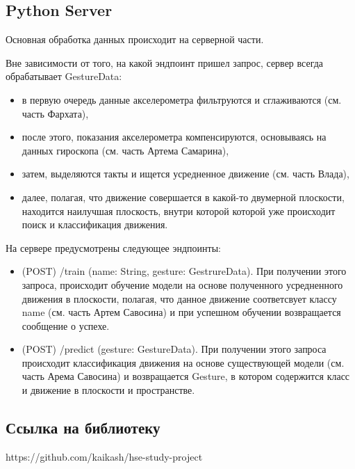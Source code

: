 \subsection{Python Server}
Основная обработка данных происходит на серверной части.

Вне зависимости от того, на какой эндпоинт пришел запрос, сервер всегда обрабатывает GestureData:
\begin{itemize}
  \item в первую очередь данные акселерометра фильтруются и сглаживаются (см. часть Фархата),
  \item после этого, показания акселерометра компенсируются, основываясь на данных гироскопа (см. часть Артема Самарина),
  \item затем, выделяются такты и ищется усредненное движение (см. часть Влада),
  \item далее, полагая, что движение совершается в какой-то двумерной плоскости, находится наилучшая плоскость, внутри которой которой уже происходит поиск и классификация движения.
\end{itemize}

На сервере предусмотрены следующее эндпоинты:
\begin{itemize}
  \item (POST) /train (name: String, gesture: GestrureData). При получении этого запроса, происходит обучение модели на основе полученного усредненного движения в плоскости, полагая, что данное движение соответсвует классу name (см. часть Артем Савосина) и при успешном обучении возвращается сообщение о успехе.

  \item (POST) /predict (gesture: GestureData). При получении этого запроса происходит классификация движения на основе существующей модели (см. часть Арема Савосина) и возвращается Gesture, в котором содержится класс и движение в плоскости и пространстве.
\end{itemize}

\subsection{Ссылка на библиотеку}
https://github.com/kaikash/hse-study-project